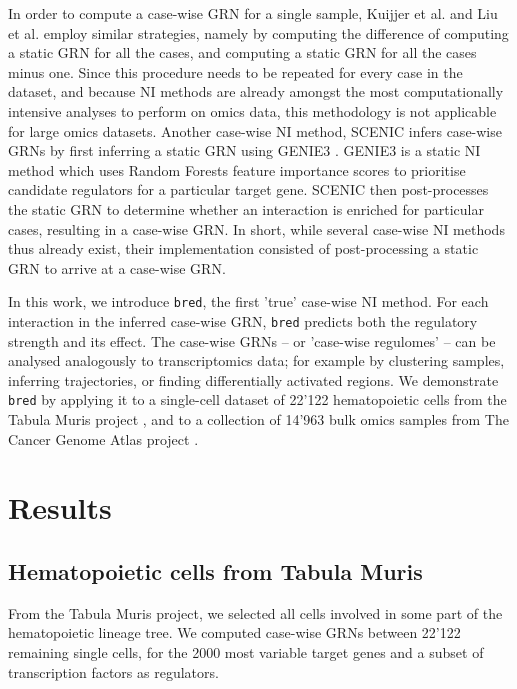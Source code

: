 In order to compute a case-wise GRN for a single sample, Kuijjer et al. \cite{kuijjer_estimatingsamplespecificregulatory_2019} and Liu et al. \cite{liu_personalizedcharacterizationdiseases_2016} employ similar strategies, namely by computing the difference of computing a static GRN for all the cases, and computing a static GRN for all the cases minus one. Since this procedure needs to be repeated for every case in the dataset, and because NI methods are already amongst the most computationally intensive analyses to perform on omics data, this methodology is not applicable for large omics datasets.
Another case-wise NI method, SCENIC \cite{aibar_scenicsinglecellregulatory_2017} infers case-wise GRNs by first inferring a static GRN using GENIE3 \cite{huynh-thu_inferringregulatorynetworks_2010}. GENIE3 is a static NI method which uses Random Forests \cite{breiman_randomforests_2001} feature importance scores to prioritise candidate regulators for a particular target gene. SCENIC then post-processes the static GRN to determine whether an interaction is enriched for particular cases, resulting in a case-wise GRN. 
In short, while several case-wise NI methods thus already exist, their implementation consisted of post-processing a static GRN to arrive at a case-wise GRN. 

In this work, we introduce \texttt{bred}, the first 'true' case-wise NI method. For each interaction in the inferred case-wise GRN, \texttt{bred} predicts both the regulatory strength and its effect. 
The case-wise GRNs -- or 'case-wise regulomes' -- can be analysed analogously to transcriptomics data; for example by clustering samples, inferring trajectories, or finding differentially activated regions.
We demonstrate \texttt{bred} by applying it to a single-cell dataset of 22'122 hematopoietic cells from the Tabula Muris project \cite{schaum_singlecelltranscriptomics20_2018}, and to a collection of 14'963 bulk omics samples from The Cancer Genome Atlas project \cite{weinstein_cancergenomeatlas_2013}.


\section{Results}


\subsection{Hematopoietic cells from Tabula Muris}
From the Tabula Muris \cite{schaum_singlecelltranscriptomics20_2018} project, we selected all cells involved in some part of the hematopoietic lineage tree. We computed case-wise GRNs between 22'122 remaining single cells, for the 2000 most variable target genes and a subset of transcription factors as regulators.

